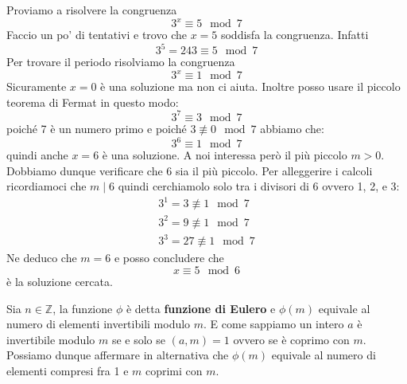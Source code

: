 \begin{example}
	Proviamo a risolvere la congruenza
	\begin{equation*}
		3^x \equiv 5 \mod{7}
	\end{equation*}
	Faccio un po' di tentativi e trovo che $x = 5$ soddisfa la congruenza. Infatti
	\begin{equation*}
		3^5 = 243 \equiv 5 \mod{7}
	\end{equation*}
	Per trovare il periodo risolviamo la congruenza
	\begin{equation*}
		3^x \equiv 1 \mod{7}
	\end{equation*}
	Sicuramente $x = 0$ \`e una soluzione ma non ci aiuta. Inoltre posso usare il piccolo teorema di
	Fermat in questo modo:
	\begin{equation*}
		3^7 \equiv 3 \mod{7}
	\end{equation*}
	poich\'e 7 \`e un numero primo e poich\'e $3 \not \equiv 0 \mod{7}$ abbiamo che:
	\begin{equation*}
		3^6 \equiv 1 \mod{7}
	\end{equation*}
	quindi anche $x = 6$ \`e una soluzione. A noi interessa per\`o il pi\`u piccolo $m > 0$.
	Dobbiamo dunque verificare che 6 sia il pi\`u piccolo. Per alleggerire i calcoli ricordiamoci che
	$m \mid 6$ quindi cerchiamolo solo tra i divisori di 6 ovvero 1, 2, e 3:
	\begin{equation*}
		\begin{array}{c}
			3^1 = 3 \not \equiv 1 \mod{7} \\
			3^2 = 9 \not \equiv 1 \mod{7} \\
			3^3 = 27 \not \equiv 1 \mod{7}
		\end{array}
	\end{equation*}
	Ne deduco che $m = 6$ e posso concludere che
	\begin{equation*}
		x \equiv 5 \mod{6}
	\end{equation*}
	\`e la soluzione cercata.
\end{example}

\begin{defn}
	Sia $n \in \mathbb{Z}$, la funzione $\phi$ \`e detta \textbf{funzione di Eulero} e
	$\phi (m)$ equivale al numero di elementi invertibili modulo $m$. E come sappiamo un intero
	$a$ \`e invertibile modulo $m$ se e solo se $(a, m) = 1$ ovvero se \`e coprimo con $m$.
	Possiamo dunque affermare in alternativa che $\phi (m)$ equivale al numero di elementi
	compresi fra 1 e $m$ coprimi con $m$.
\end{defn}

